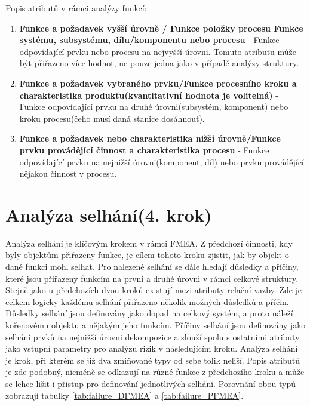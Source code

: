 \newpage
Popis atributů v rámci analýzy funkcí:
\begin{enumerate}
	\item \textbf{Funkce a požadavek vyšší úrovně / Funkce položky procesu Funkce systému, subsystému, dílu/komponentu nebo procesu} - Funkce odpovídající prvku nebo procesu na nejvyšší úrovni. Tomuto atributu může být přiřazeno více hodnot, ne pouze jedna jako v případě analýzy struktury.
	\item \textbf{Funkce a požadavek vybraného prvku/Funkce procesního kroku a charakteristika produktu(kvantitativní hodnota je volitelná)} - Funkce odpovídající prvku na druhé úrovni(subsystém, komponent) nebo kroku procesu(čeho musí daná stanice dosáhnout).
	\item \textbf{Funkce a požadavek nebo charakteristika nižší úrovně/Funkce prvku provádějící činnost a charakteristika procesu} - Funkce odpovídající prvku na nejnižší úrovni(komponent, díl) nebo prvku provádějící nějakou činnost v procesu.
\end{enumerate}

\section{Analýza selhání(4. krok)}
Analýza selhání je klíčovým krokem v rámci FMEA. Z předchozí činnosti, kdy byly objektům přiřazeny funkce, je cílem tohoto kroku zjistit, jak by objekt o dané funkci mohl selhat. Pro nalezené selhání se dále hledají důsledky a příčiny, které jsou přiřazeny funkcím na první a druhé úrovni v rámci celkové struktury. Stejně jako u předchozích dvou kroků existují mezi atributy relační vazby. Zde je celkem logicky každému selhání přiřazeno několik možných důsledků a příčin. Důsledky selhání jsou definovány jako dopad na celkový systém, a proto náleží kořenovému objektu a nějakým jeho funkcím. Příčiny selhání jsou definovány jako selhání prvků na nejnižší úrovni dekompozice a slouží spolu s ostatními atributy jako vstupní parametry pro analýzu rizik v následujícím kroku. Analýza selhání je krok, při kterém se již dva zmiňované typy od sebe tolik neliší. Popis atributů je zde podobný, nicméně se odkazují na různé funkce z předchozího kroku a může se lehce lišit i přístup pro definování jednotlivých selhání. Porovnání obou typů zobrazují tabulky \ref{tab:failure_DFMEA} a \ref{tab:failure_PFMEA}.

